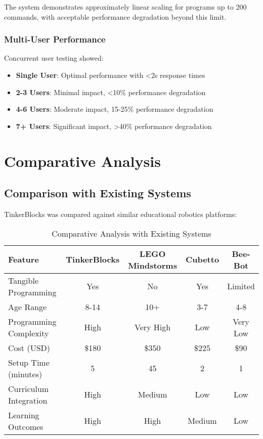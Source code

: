 The system demonstrates approximately linear scaling for programs up to 200 commands, with acceptable performance degradation beyond this limit.

\subsubsection{Multi-User Performance}

Concurrent user testing showed:

\begin{itemize}
    \item \textbf{Single User}: Optimal performance with <2s response times
    \item \textbf{2-3 Users}: Minimal impact, <10\% performance degradation
    \item \textbf{4-6 Users}: Moderate impact, 15-25\% performance degradation
    \item \textbf{7+ Users}: Significant impact, >40\% performance degradation
\end{itemize}

\section{Comparative Analysis}

\subsection{Comparison with Existing Systems}

TinkerBlocks was compared against similar educational robotics platforms:

\begin{table}[H]
\centering
\caption{Comparative Analysis with Existing Systems}
\begin{tabular}{|l|c|c|c|c|}
\hline
\textbf{Feature} & \textbf{TinkerBlocks} & \textbf{LEGO Mindstorms} & \textbf{Cubetto} & \textbf{Bee-Bot} \\
\hline
Tangible Programming & Yes & No & Yes & Limited \\
Age Range & 8-14 & 10+ & 3-7 & 4-8 \\
Programming Complexity & High & Very High & Low & Very Low \\
Cost (USD) & \$180 & \$350 & \$225 & \$90 \\
Setup Time (minutes) & 5 & 45 & 2 & 1 \\
Curriculum Integration & High & Medium & Low & Low \\
Learning Outcomes & High & High & Medium & Low \\
\hline
\end{tabular}
\label{tab:comparison}
\end{table}

